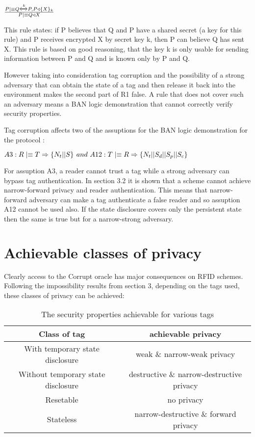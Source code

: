     \begin{center}
        $ \frac{P \mid\equiv Q \xleftrightarrow{k} P, P \triangleleft \{X\}_{k}}{P \mid\equiv Q \triangleleft X} $
    \end{center}
    
    This rule states: if P believes that Q and P have a shared secret (a key for this rule) and P receives encrypted X by secret key k, then
    P can believe Q has sent X. This rule is based on good reasoning, that the key k is only usable for sending information between P and Q 
    and is known only by P and Q.

    However taking into consideration tag corruption and the possibility of a strong adversary that can obtain the state of a tag and then
    release it back into the environment makes the second part of R1 false. A rule that does not cover such an adversary means a BAN
    logic demonstration that cannot correctly verify security properties.
    
    Tag corruption affects two of the assuptions for the BAN logic demonstration for the protocol \cite{BOM}:

    \begin{center}
        $ A3: R \mid\equiv T \Rightarrow \{N_t||S\}_{}\ and\ A12: T \mid\equiv R \Rightarrow \{N_t||S_d||S_p||S_c\} $
    \end{center}

    For assuption A3, a reader cannot trust a tag while a strong adversary can bypass tag authentication. In section 3.2 it is shown 
    that a scheme cannot
    achieve narrow-forward privacy and reader authentication. This means that narrow-forward adversary can make a tag authenticate
    a false reader and so assuption A12 cannot be used also. If the state disclosure covers only the persistent state then the same is
    true but for a narrow-strong adversary.

\section{Achievable classes of privacy}

    Clearly access to the Corrupt oracle has major consequences on RFID schemes. Following the impossibility results from section 3, 
    depending on the tags used, these classes of privacy can be achieved:

    \begin{table}[H]
    \centering
    \caption{The security properties achievable for various tags}
    \begin{tabular}{| c | c |}
        \hline
        Class of tag & achievable privacy \\
        \hline
        With temporary state disclosure & weak \& narrow-weak privacy\\
        Without temporary state disclosure & destructive \& narrow-destructive privacy\\
        Resetable & no privacy \\
        Stateless & narrow-destructive \& forward privacy \\
        \hline
    \end{tabular}
    \end{table}

